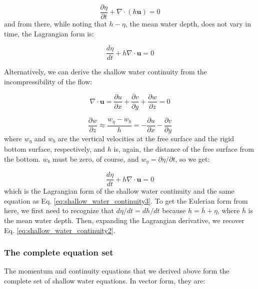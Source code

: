 \documentclass[12pt]{article}
\numberwithin{equation}{section}
\numberwithin{figure}{section}
\numberwithin{table}{section}
\begin{document}
\begin{equation}
  \frac{\partial \eta}{\partial t} + \nabla \cdot (h \mathbf{u}) = 0
  \label{eq:shallow_water_continuity2}
\end{equation}
and from there, while noting that $h - \eta$, the mean water depth, does not vary
in time, the Lagrangian form is:

\begin{equation}
  \frac{d \eta}{dt} + h \nabla \cdot \mathbf{u} = 0
  \label{eq:shallow_water_continuity3}
\end{equation}

Alternatively, we can derive the shallow water continuity from the incompressibility
of the flow:

\begin{equation}
  \nabla \cdot \mathbf{u} = 
  \frac{\partial u}{\partial x} + 
  \frac{\partial v}{\partial y} + 
  \frac{\partial w}{\partial z} = 0
\end{equation}

\begin{equation}
  \frac{\partial w}{\partial z} \approx \frac{w_\eta - w_b}{h} = - \frac{\partial u}{\partial x} - \frac{\partial v}{\partial y}
\end{equation}
where $w_\eta$ and $w_b$ are the vertical velocities at the free surface and the
rigid bottom surface, respectively, and $h$ is, again, the distance of the free
surface from the bottom.
$w_b$ must be zero, of course, and $w_\eta = \partial \eta / \partial t$,
so we get:

\begin{equation}
  \frac{d \eta}{dt} + h \nabla \cdot \mathbf{u} = 0
\end{equation}
which is the Lagrangian form of the shallow water continuity and the same
equation as Eq. \ref{eq:shallow_water_continuity3}.
To get the Eulerian form from here, we first need to recognize that
$d\eta/dt = dh/dt$ because $h = \overline{h} + \eta$, where $\overline{h}$ is the
mean water depth.
Then, expanding the Lagrangian derivative, we recover Eq.
\ref{eq:shallow_water_continuity2}.

\subsubsection{The complete equation set}

The momentum and continuity equations that we derived above form the complete
set of shallow water equations.
In vector form, they are:
\end{document}
